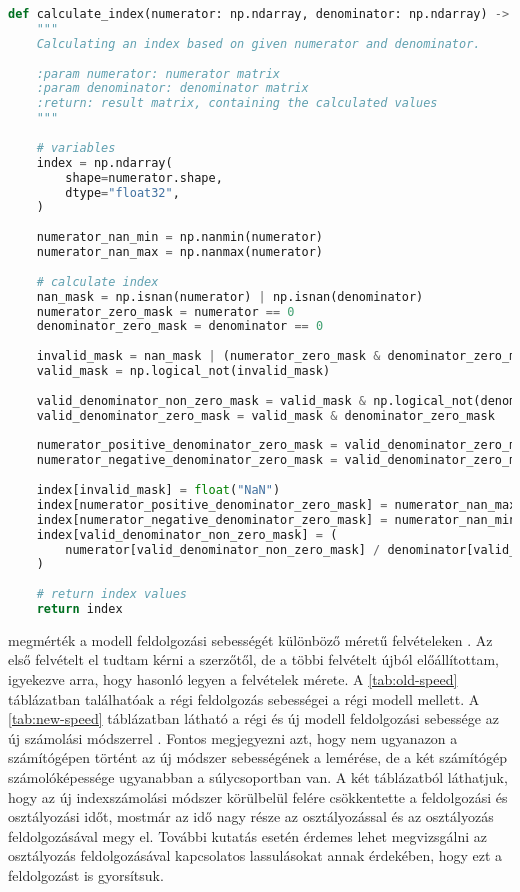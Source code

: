 
\begin{lstlisting}[language={Python}]
def calculate_index(numerator: np.ndarray, denominator: np.ndarray) -> np.ndarray:
    """
    Calculating an index based on given numerator and denominator.
    
    :param numerator: numerator matrix
    :param denominator: denominator matrix
    :return: result matrix, containing the calculated values
    """
    
    # variables
    index = np.ndarray(
        shape=numerator.shape,
        dtype="float32",
    )
    
    numerator_nan_min = np.nanmin(numerator)
    numerator_nan_max = np.nanmax(numerator)
    
    # calculate index
    nan_mask = np.isnan(numerator) | np.isnan(denominator)
    numerator_zero_mask = numerator == 0
    denominator_zero_mask = denominator == 0
    
    invalid_mask = nan_mask | (numerator_zero_mask & denominator_zero_mask)
    valid_mask = np.logical_not(invalid_mask)
    
    valid_denominator_non_zero_mask = valid_mask & np.logical_not(denominator_zero_mask)
    valid_denominator_zero_mask = valid_mask & denominator_zero_mask
    
    numerator_positive_denominator_zero_mask = valid_denominator_zero_mask & (numerator > 0)
    numerator_negative_denominator_zero_mask = valid_denominator_zero_mask & (numerator < 0)
    
    index[invalid_mask] = float("NaN")
    index[numerator_positive_denominator_zero_mask] = numerator_nan_max
    index[numerator_negative_denominator_zero_mask] = numerator_nan_min
    index[valid_denominator_non_zero_mask] = (
        numerator[valid_denominator_non_zero_mask] / denominator[valid_denominator_non_zero_mask]
    )
    
    # return index values
    return index
\end{lstlisting}

\citeauthor{magyar2023} megmérték a modell feldolgozási sebességét különböző méretű felvételeken \cite{magyar2023}. Az első felvételt el tudtam kérni a szerzőtől, de a többi felvételt újból előállítottam, igyekezve arra, hogy hasonló legyen a felvételek mérete. A \ref{tab:old-speed} táblázatban találhatóak a régi feldolgozás sebességei a régi modell mellett. A \ref{tab:new-speed} táblázatban látható a régi és új modell feldolgozási sebessége az új számolási módszerrel . Fontos megjegyezni azt, hogy nem ugyanazon a számítógépen történt az új módszer sebességének a lemérése, de a két számítógép számolóképessége ugyanabban a súlycsoportban van. A két táblázatból láthatjuk, hogy az új indexszámolási módszer körülbelül felére csökkentette a feldolgozási és osztályozási időt, mostmár az idő nagy része az osztályozással és az osztályozás feldolgozásával megy el. További kutatás esetén érdemes lehet megvizsgálni az osztályozás feldolgozásával kapcsolatos lassulásokat annak érdekében, hogy ezt a feldolgozást is gyorsítsuk.


